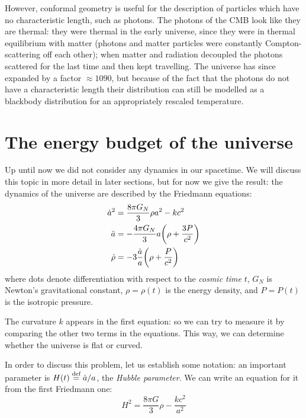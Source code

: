 \documentclass[main.tex]{subfiles}
\begin{document}
However, conformal geometry is useful for the description of particles which have no characteristic length, such as photons.
The photons of the CMB look like they are thermal: they were thermal in the early universe, since they were in thermal equilibrium with matter (photons and matter particles were constantly Compton-scattering off each other); when matter and radiation decoupled the photons scattered for the last time and then kept travelling.
The universe has since expanded by a factor \(\approx 1090\), but because of the fact that the photons do not have a characteristic length their distribution can still be modelled as a blackbody distribution for an appropriately rescaled temperature.

\section{The energy budget of the universe}

Up until now we did not consider any dynamics in our spacetime. We will discuss this topic in more detail in later sections, but for now we give the result: the dynamics of the universe are described by the Friedmann equations:
%
\begin{subequations} \label{eq:friedmann-equations} 
\begin{align}
    \dot{a}^2 &= \frac{8 \pi G_N }{3} \rho a^2 - kc^2  \\
    \ddot{a} &= - \frac{4 \pi G_N }{3} a  \qty(\rho  + \frac{3P}{c^2} )  \\
    \dot{\rho} &= -3 \frac{\dot{a} }{a} \qty(\rho + \frac{P}{c^2} )
\end{align}
\end{subequations}
%
where dots denote differentiation with respect to the \emph{cosmic time} \(t\), \(G_N\) is Newton's gravitational constant, \(\rho = \rho( t) \) is the energy density, and \(P = P(t)\) is  the isotropic pressure.

The curvature \(k\) appears in the first equation: so we can try to measure it by comparing the other two terms in the equations.
This way, we can determine whether the universe is flat or curved.

In order to discuss this problem, let us establish some notation: an important parameter is \(H(t) \stackrel{\text{def}}{=} \dot{a} / a\), the \emph{Hubble parameter}.
We can write an equation for it from the first Friedmann one:
%
\begin{equation} \label{eq:hubble-parameter-evolution}
  H^2 = \frac{8 \pi G}{3} \rho - \frac{kc^2}{a^2}
\end{equation}
\end{document}
